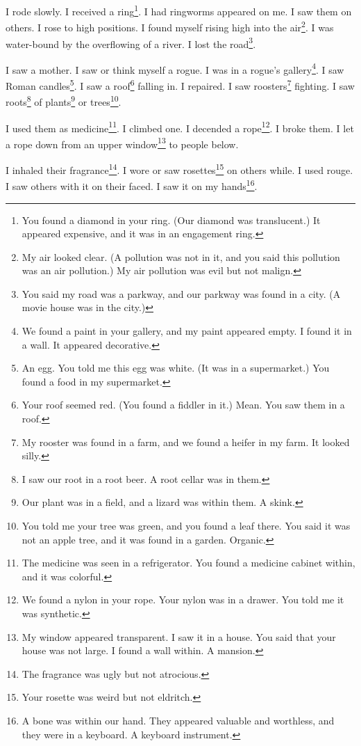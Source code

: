 \documentclass[12pt]{book}
\begin{document}
 I rode slowly. I received a ring\footnote{You found a diamond in your ring. (Our diamond was translucent.) It appeared expensive, and it was in an engagement ring.}. I had ringworms appeared on me. I saw them on others. I rose to high positions. I found myself rising high into the air\footnote{My air looked clear. (A pollution was not in it, and you said this pollution was an air pollution.) My air pollution was evil but not malign.}. I was water-bound by the overflowing of a river. I lost the road\footnote{You said my road was a parkway, and our parkway was found in a city. (A movie house was in the city.)}. 

 I saw a mother. I saw or think myself a rogue. I was in a rogue's gallery\footnote{We found a paint in your gallery, and my paint appeared empty. I found it in a wall. It appeared decorative.}. I saw Roman candles\footnote{An egg. You told me this egg was white. (It was in a supermarket.) You found a food in my supermarket.}. I saw a roof\footnote{Your roof seemed red. (You found a fiddler in it.) Mean. You saw them in a roof.} falling in. I repaired. I saw roosters\footnote{My rooster was found in a farm, and we found a heifer in my farm. It looked silly.} fighting. I saw roots\footnote{I saw our root in a root beer. A root cellar was in them.} of plants\footnote{Our plant was in a field, and a lizard was within them. A skink.} or trees\footnote{You told me your tree was green, and you found a leaf there. You said it was not an apple tree, and it was found in a garden. Organic.}. 

 I used them as medicine\footnote{The medicine was seen in a refrigerator. You found a medicine cabinet within, and it was colorful.}. I climbed one. I decended a rope\footnote{We found a nylon in your rope. Your nylon was in a drawer. You told me it was synthetic.}. I broke them. I let a rope down from an upper window\footnote{My window appeared transparent. I saw it in a house. You said that your house was not large. I found a wall within. A mansion.} to people below. 

 I inhaled their fragrance\footnote{The fragrance was ugly but not atrocious.}. I wore or saw rosettes\footnote{Your rosette was weird but not eldritch.} on others while. I used rouge. I saw others with it on their faced. I saw it on my hands\footnote{A bone was within our hand. They appeared valuable and worthless, and they were in a keyboard. A keyboard instrument.}. 
\end{document}

